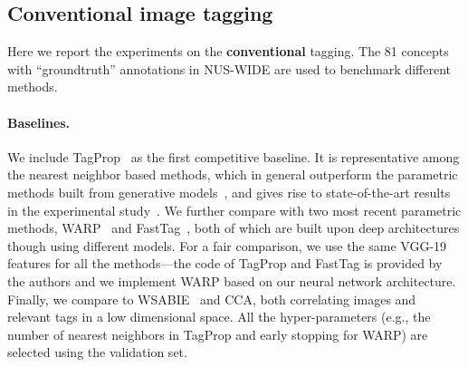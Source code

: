 \documentclass[10pt,twocolumn,letterpaper]{article}
\begin{document}
\subsection{Conventional image tagging}
Here we report the experiments on the \textbf{conventional}  tagging. The 81 concepts with ``groundtruth''  annotations in NUS-WIDE are used to benchmark  different methods.
\vspace{-11pt} 

\paragraph{Baselines.} We include TagProp~\cite{guillaumin_tagprop:_2009} as the first competitive baseline. It is representative among the nearest neighbor based methods, which in general outperform the parametric methods built from generative models~\cite{barnard_matching_2003,carneiro_supervised_2007}, and gives rise to state-of-the-art results in the experimental study~\cite{li_socializing_2015}. We further compare with  two most recent parametric methods, WARP~\cite{gong_deep_2013} and FastTag~\cite{chen_fast_2013}, both of which are built upon deep architectures though using different models. For a fair comparison, we use the same VGG-19 features for all the methods---the code of TagProp and FastTag is provided by the authors and we implement WARP based on our neural network architecture. Finally, we compare to WSABIE~\cite{weston_wsabie:_2011} and CCA, both correlating images and relevant tags in a low dimensional space. All the hyper-parameters (e.g., the number of nearest neighbors in TagProp and early stopping for WARP) are selected using the validation set. 
\vspace{-13pt}
\end{document}
